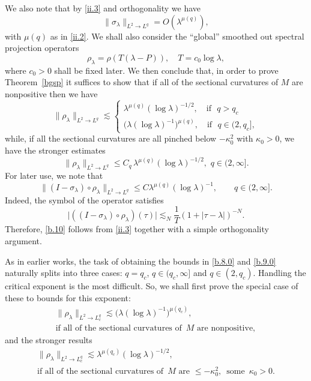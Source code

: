 \documentclass[10pt]{amsart}
\newcommand{\la}{\lambda}
\newcommand{\1}{{\bf 1}}
\begin{document}
We also note that
by \eqref{ii.3} and orthogonality we have
\begin{equation}\label{b.6}
\| \sigma_\la\|_{L^2\to L^q}=O(\la^{\mu(q)}),
\end{equation}
with $\mu(q)$ as in \eqref{ii.2}.
We shall also consider the ``global'' smoothed out spectral projection operators
\begin{equation}\label{b.7}
\rho_\la =\rho(T(\la-P))
, \quad T=c_0\log\la,
\end{equation}
where $c_0>0$ shall be fixed later.  We then conclude that, in order to prove
Theorem~\ref{bgsp} it suffices to show that if all of the sectional curvatures
of $M$ are nonpositive then we have
\begin{equation}\label{b.8.0}
\| \rho_\la \|_{L^2\to L^q}\lesssim
\begin{cases} \la^{\mu(q)}(\log\la)^{-1/2}, \quad \text{if } \, \, q>q_c
\\
\bigl(\la(\log\la)^{-1}\bigr)^{\mu(q)}, \quad \text{if } \, \, q\in (2,q_c],
\end{cases}
\end{equation}
while, if all the sectional curvatures are all pinched below $-\kappa^2_0$ with $\kappa_0>0$, we have the stronger estimates
\begin{equation}\label{b.9.0}
\| \rho_\la \|_{L^2\to L^q}\le C_q \, \la^{\mu(q)}(\log\la)^{-1/2}, \, \, q\in (2,\infty].
\end{equation}
For later use, we note that
\begin{equation}\label{b.10}
\|(I-\sigma_\lambda)\circ \rho_\lambda\|_{L^2\to L^q}
\le C \lambda^{\mu(q)} (\log \lambda)^{-1}, \qquad q\in (2,\infty].
\end{equation}
Indeed, the symbol of the operator satisfies
$$
\bigl|((I-\sigma_\lambda)\circ \rho_\lambda ) (\tau)\bigr|
\lesssim_N \frac1T (1+|\tau-\lambda|)^{-N}.
$$
Therefore, \eqref{b.10} follows from \eqref{ii.3} together with a simple orthogonality argument.


As in earlier works, the task of obtaining the bounds in \eqref{b.8.0} and \eqref{b.9.0}
naturally splits into three cases: $q=q_c$, $q\in (q_c,\infty]$ and $q\in (2,q_c)$.  Handling
the critical exponent is the most difficult.  So, we shall first prove the special case
of these to bounds for this exponent:
\begin{multline}\label{b.8.1}
\|\rho_\la\|_{L^2\to L^q_c}\lesssim \bigl(\la(\log\la)^{-1}\bigr)^{\mu(q_c)},
\\
\text{if all of the sectional curvatures of } \, M \, \, \text{are nonpositive},
\end{multline}
and the stronger results
\begin{multline}\label{b.9.1}
\|\rho_\la\|_{L^2\to L^q_c}\lesssim \la^{\mu(q_c)}(\log\la)^{-1/2},
\\
\text{if all of the sectional curvatures of } \, M \, \, \text{are }  \le -\kappa_0^2, \, \,
\, \text{some } \, \kappa_0>0.
\end{multline}
\end{document}
